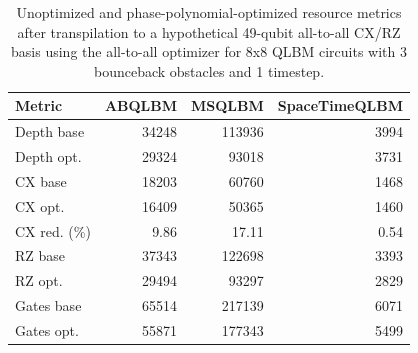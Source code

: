 \begin{table}[ht]
\centering
\begin{tabular}{lrrr}
\hline
Metric & ABQLBM & MSQLBM & SpaceTimeQLBM \\
\hline
Depth base & 34248 & 113936 & 3994 \\
Depth opt. & 29324 & 93018 & 3731 \\
CX base & 18203 & 60760 & 1468 \\
CX opt. & 16409 & 50365 & 1460 \\
CX red. (\%) & 9.86 & 17.11 & 0.54 \\
RZ base & 37343 & 122698 & 3393 \\
RZ opt. & 29494 & 93297 & 2829 \\
Gates base & 65514 & 217139 & 6071 \\
Gates opt. & 55871 & 177343 & 5499 \\
\hline
\end{tabular}
\caption{Unoptimized and phase-polynomial-optimized resource metrics after transpilation to a hypothetical 49-qubit all-to-all CX/RZ basis using the all-to-all optimizer for 8x8 QLBM circuits with 3 bounceback obstacles and 1 timestep.}
\label{tab:phase-poly-optimization-comparison-8x8-obs3-t1-all-to-all}
\end{table}
